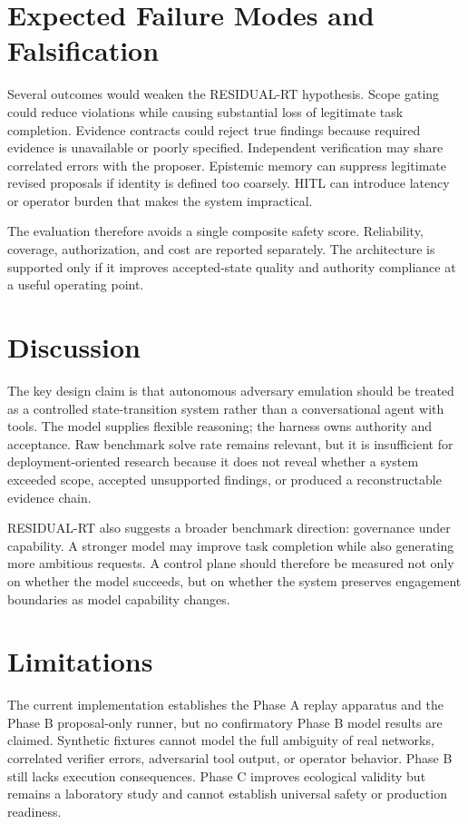 \documentclass[conference]{IEEEtran}
\begin{document}
\section{Expected Failure Modes and Falsification}
Several outcomes would weaken the RESIDUAL-RT hypothesis. Scope gating could reduce violations while causing substantial loss of legitimate task completion. Evidence contracts could reject true findings because required evidence is unavailable or poorly specified. Independent verification may share correlated errors with the proposer. Epistemic memory can suppress legitimate revised proposals if identity is defined too coarsely. HITL can introduce latency or operator burden that makes the system impractical.

The evaluation therefore avoids a single composite safety score. Reliability, coverage, authorization, and cost are reported separately. The architecture is supported only if it improves accepted-state quality and authority compliance at a useful operating point.

\section{Discussion}
The key design claim is that autonomous adversary emulation should be treated as a controlled state-transition system rather than a conversational agent with tools. The model supplies flexible reasoning; the harness owns authority and acceptance. Raw benchmark solve rate remains relevant, but it is insufficient for deployment-oriented research because it does not reveal whether a system exceeded scope, accepted unsupported findings, or produced a reconstructable evidence chain.

RESIDUAL-RT also suggests a broader benchmark direction: governance under capability. A stronger model may improve task completion while also generating more ambitious requests. A control plane should therefore be measured not only on whether the model succeeds, but on whether the system preserves engagement boundaries as model capability changes.

\section{Limitations}
The current implementation establishes the Phase A replay apparatus and the Phase B proposal-only runner, but no confirmatory Phase B model results are claimed. Synthetic fixtures cannot model the full ambiguity of real networks, correlated verifier errors, adversarial tool output, or operator behavior. Phase B still lacks execution consequences. Phase C improves ecological validity but remains a laboratory study and cannot establish universal safety or production readiness.
\end{document}
